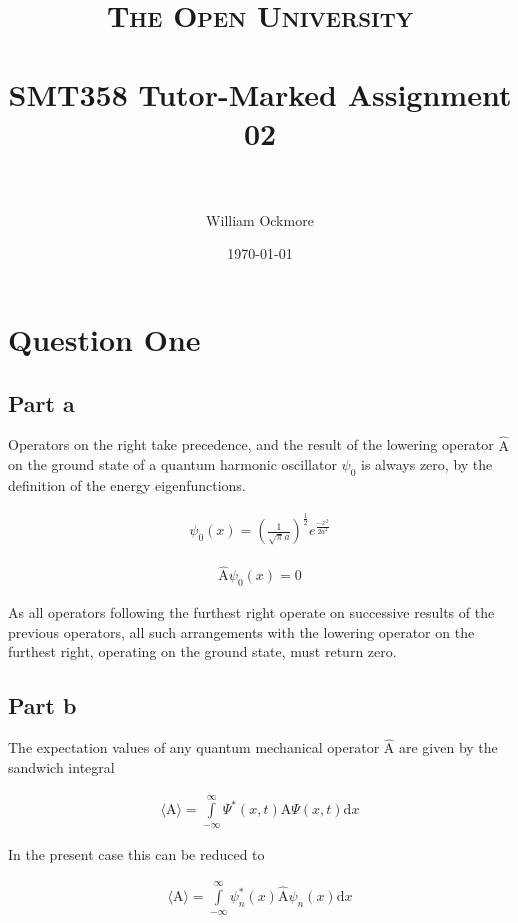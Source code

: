 \documentclass[paper=a4, fontsize=11pt]{scrartcl} %
\title{
\normalfont \normalsize
\textsc{The Open University} \\ [25pt] %
\horrule{0.5pt} \\[0.4cm] %
\huge SMT358 Tutor-Marked Assignment 02 \\ %
\horrule{2pt} \\[0.5cm] %
}
\author{William Ockmore} %
\date{\normalsize\today} %
\numberwithin{equation}{section} %
\numberwithin{figure}{section} %
\numberwithin{table}{section} %
\begin{document}
\maketitle %


\section{Question One}

\subsection{Part a}
Operators on the right take precedence, and the result of the lowering operator $\hat{\textrm{A}}$ on the ground state of a quantum harmonic oscillator $\psi_0$ is always zero, by the definition of the energy eigenfunctions.

\begin{align}
\psi_0 (x) =
\left(\frac{1}{\sqrt{\pi}a}\right)^{\frac{1}{2}}
e^{\frac{-x^2}{2a^2}}
\end{align}

\begin{align}
\hat{\textrm{A}}\psi_0 (x) = 0
\end{align}

As all operators following the furthest right operate on successive results of the previous operators, all such arrangements with the lowering operator on the furthest right, operating on the ground state, must return zero.

\subsection{Part b}
The expectation values of any quantum mechanical operator $\hat{\textrm{A}}$ are given by the sandwich integral

\begin{align}
\langle \textrm{A} \rangle =
\int\limits_{-\infty}^{\infty}\Psi^*\left(x,t\right) \hat{\textrm{A}} \Psi\left(x,t\right) \mathrm{d}x
\end{align}

In the present case this can be reduced to

\begin{align}
\langle \textrm{A} \rangle =
\int\limits_{-\infty}^{\infty}\psi^*_n\left(x\right) \hat{\textrm{A}} \psi_n\left(x\right) \mathrm{d}x
\end{align}
\end{document}
